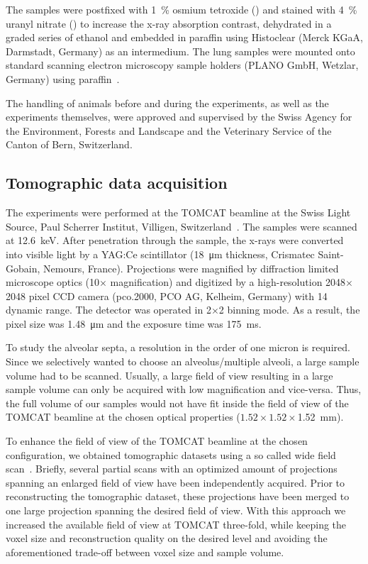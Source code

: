 \documentclass[%
	paper=a4,%
	DIV=calc,%
	twoside=true,%
	draft=true,%
	abstract=false]{scrartcl}
\begin{document}
The samples were postfixed with \SI{1}{\percent} osmium tetroxide () and stained with \SI{4}{\percent} uranyl nitrate () to increase the x-ray absorption contrast, dehydrated in a graded series of ethanol and embedded in paraffin using Histoclear (Merck KGaA, Darmstadt, Germany) as an intermedium. The lung samples were mounted onto standard scanning electron microscopy sample holders (PLANO GmbH, Wetzlar, Germany) using paraffin~\cite{Tsuda2008}.

The handling of animals before and during the experiments, as well as the experiments themselves, were approved and supervised by the Swiss Agency for the Environment, Forests and Landscape and the Veterinary Service of the Canton of Bern, Switzerland.

\subsection{Tomographic data acquisition}
The experiments were performed at the TOMCAT beamline at the Swiss Light Source, Paul Scherrer Institut, Villigen, Switzerland~\cite{Stampanoni2006a}. The samples were scanned at \SI{12.6}{\kilo\electronvolt}. After penetration through the sample, the x-rays were converted into visible light by a YAG:Ce scintillator (\SI{18}{\micro\meter} thickness, Crismatec Saint-Gobain, Nemours, France). Projections were magnified by diffraction limited microscope optics (10\(\times\) magnification) and digitized by a high-resolution 2048\(\times\)2048 pixel CCD camera (pco.2000, PCO AG, Kelheim, Germany) with \SI{14}{\bit} dynamic range. The detector was operated in 2\(\times\)2 binning mode. As a result, the pixel size was \SI{1.48}{\micro\meter} and the exposure time was \SI{175}{\milli\second}.

To study the alveolar septa, a resolution in the order of one micron is required. Since we selectively wanted to choose an alveolus/multiple alveoli, a large sample volume had to be scanned. Usually, a large field of view resulting in a large sample volume can only be acquired with low magnification and vice-versa. Thus, the full volume of our samples would not have fit inside the field of view of the TOMCAT beamline at the chosen optical properties (\(1.52\times1.52\times\)\SI{1.52}{\milli\meter}).

To enhance the field of view of the TOMCAT beamline at the chosen configuration, we obtained tomographic datasets using a so called wide field scan~\cite{Haberthuer2010}. Briefly, several partial scans with an optimized amount of projections spanning an enlarged field of view have been independently acquired. Prior to reconstructing the tomographic dataset, these projections have been merged to one large projection spanning the desired field of view. With this approach we increased the available field of view at TOMCAT three-fold, while keeping the voxel size and reconstruction quality on the desired level and avoiding the aforementioned trade-off between voxel size and sample volume.
\end{document}
